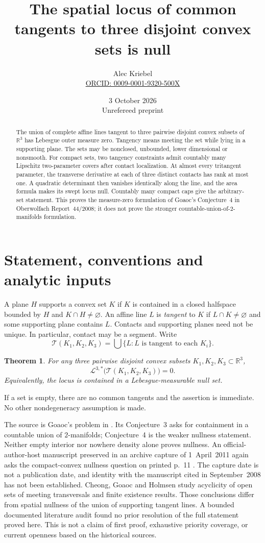 \documentclass[11pt]{article}
\title{The spatial locus of common tangents to three disjoint convex sets is null}
\author{Alec Kriebel\\\small\href{https://orcid.org/0009-0001-9320-500X}{ORCID: 0009-0001-9320-500X}}
\date{3 October 2026\\\small Unrefereed preprint}
\newcommand{\R}{\mathbb R}
\newcommand{\Leb}{\mathcal L}
\newtheorem{theorem}{Theorem}
\theoremstyle{remark}
\begin{document}
\maketitle
\begin{abstract}
The union of complete affine lines tangent to three pairwise disjoint convex subsets of $\R^3$ has Lebesgue outer measure zero. Tangency means meeting the set while lying in a supporting plane. The sets may be nonclosed, unbounded, lower dimensional or nonsmooth. For compact sets, two tangency constraints admit countably many Lipschitz two-parameter covers after contact localization. At almost every tritangent parameter, the transverse derivative at each of three distinct contacts has rank at most one. A quadratic determinant then vanishes identically along the line, and the area formula makes its swept locus null. Countably many compact caps give the arbitrary-set statement. This proves the measure-zero formulation of Goaoc's Conjecture~4 in Oberwolfach Report~44/2008; it does not prove the stronger countable-union-of-$2$-manifolds formulation.
\end{abstract}

\section{Statement, conventions and analytic inputs}
A plane $H$ supports a convex set $K$ if $K$ is contained in a closed halfspace bounded by $H$ and $K\cap H\ne\varnothing$. An affine line $L$ is \emph{tangent} to $K$ if $L\cap K\ne\varnothing$ and some supporting plane contains $L$. Contacts and supporting planes need not be unique. In particular, contact may be a segment. Write
\[
\mathcal T(K_1,K_2,K_3)=\bigcup\{L:L\text{ is tangent to each }K_i\}.
\]
\begin{theorem}\label{thm:main}
For any three pairwise disjoint convex subsets $K_1,K_2,K_3\subset\R^3$,
\[
\Leb^{3,*}\bigl(\mathcal T(K_1,K_2,K_3)\bigr)=0.
\]
Equivalently, the locus is contained in a Lebesgue-measurable null set.
\end{theorem}
If a set is empty, there are no common tangents and the assertion is immediate. No other nondegeneracy assumption is made.

The source is Goaoc's problem in \cite[section~13, p.~2552]{goaoc2008}. Its Conjecture~3 asks for containment in a countable union of $2$-manifolds; Conjecture~4 is the weaker nullness statement. Neither empty interior nor nowhere density alone proves nullness. An official-author-host manuscript preserved in an archive capture of 1~April~2011 again asks the compact-convex nullness question on printed p.~11 \cite{demouthgoaoc}. The capture date is not a publication date, and identity with the manuscript cited in September~2008 has not been established. Cheong, Goaoc and Holmsen \cite{cheong2024} study acyclicity of open sets of meeting transversals and finite existence results. Those conclusions differ from spatial nullness of the union of supporting tangent lines. A bounded documented literature audit found no prior resolution of the full statement proved here. This is not a claim of first proof, exhaustive priority coverage, or current openness based on the historical sources.
\end{document}
